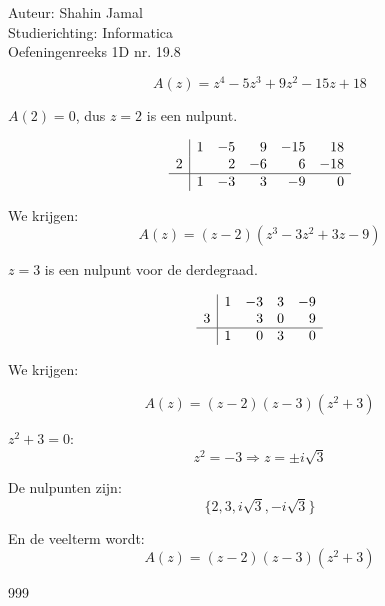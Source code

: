 \documentclass[a4paper]{article}
\begin{document}
  
\noindent \large Auteur: Shahin Jamal \\
\noindent \large Studierichting: Informatica\\
\noindent \large Oefeningenreeks 1D nr. 19.8\\

\medskip

\normalsize

\[
A(z) = z^4 - 5z^3 + 9z^2 - 15z + 18
\]

\( A(2) = 0 \), dus \( z = 2 \) is een nulpunt.

\[
\begin{array}{r|rrrrr}
  & 1 & -5 & 9 & -15 & 18 \\
2 &   & 2 & -6 & 6 & -18 \\
\hline
  & 1 & -3 & 3 & -9 & 0 \\
\end{array}
\]

We krijgen:
\[
A(z) = (z - 2)(z^3 - 3z^2 + 3z - 9)
\]

\( z = 3 \) is een nulpunt voor de derdegraad.

\[
\begin{array}{r|rrrr}
  & 1 & -3 & 3 & -9 \\
3 &   & 3 & 0 & 9 \\
\hline
  & 1 & 0 & 3 & 0 \\
\end{array}
\]

We krijgen:

\[
A(z) = (z - 2)(z - 3)(z^2 + 3)
\]

\( z^2 + 3 = 0 \):
\[
z^2 = -3 \Rightarrow z = \pm i\sqrt{3}
\]

De nulpunten zijn:
\[
\{2, 3, i\sqrt{3}, -i\sqrt{3} \}
\]

En de veelterm wordt:
\[
A(z) = (z - 2)(z - 3)(z^2 + 3)
\]
\begin{thebibliography}{999}
\end{thebibliography}
\end{document}
